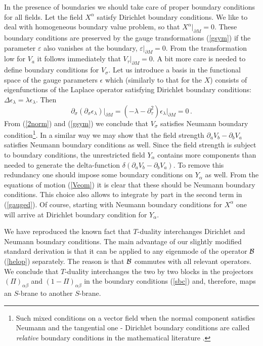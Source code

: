 \documentclass[a4paper,12pt,twoside]{article}
\begin{document}
In the presence of boundaries we should take care of proper
boundary conditions for all fields. Let the field $X^\alpha$
satisfy Dirichlet boundary conditions. We like to deal with
homogeneous boundary value problem, so that $X^\alpha|_{\partial M}=0$.
These boundary conditions are preserved by the gauge transformations
(\ref{gsym}) if the parameter $\varepsilon$ also vanishes at the
boundary, $\varepsilon|_{\partial M}=0$. From the transformation
low for $V_a$ it follows immediately that $V_\tau|_{\partial M}=0$.
A bit more care is needed to define boundary conditions for $V_\sigma$.
Let us introduce a basis in the functional space of the gauge
parameters $\epsilon$ which (similarly to that for the $X$) consists
of eigenfunctions of the Laplace operator satisfying Dirichlet
boundary conditions: $\Delta \epsilon_\lambda =\lambda \epsilon_\lambda$.
Then
\begin{equation}
\partial_\sigma (\partial_\sigma \epsilon_\lambda )\vert_{\partial M}=
(-\lambda -\partial_\tau^2 ) \epsilon_\lambda \vert_{\partial M}=0\,.
\label{2norm}
\end{equation} 
{}From (\ref{2norm}) and (\ref{gsym}) we conclude that $V_\sigma$
satisfies Neumann boundary condition\footnote{Such mixed 
conditions on a vector field when the normal component
satisfies Neumann and the tangential one - Dirichlet boundary
conditions are called {\it relative} boundary conditions in the mathematical
literature \cite{Gilkey}.}. In a similar way we may show that
the field strength $\partial_aV_b-\partial_bV_a$ satisfies 
Neumann boundary conditions as well. Since the field strength
is subject to boundary conditions, the unrestricted field $Y_\alpha$
contains more components than needed
 to generate the 
delta-function $\delta (\partial_aV_b-\partial_bV_a)$. 
To remove this redundancy one should impose some boundary conditions
on $Y_\alpha$ as well. From the equations of motion (\ref{Veom})
it is clear that these should be Neumann boundary conditions.
This choice also
allows to integrate by part in the second term in (\ref{gauged}).
Of course, starting with Neumann boundary conditions for
$X^\alpha$ one will arrive at Dirichlet boundary condition
for $Y_\alpha$. 

We have reproduced the known fact that $T$-duality interchanges
Dirichlet and Neumann boundary conditions. The main advantage
of our slightly modified standard derivation is that it can be
applied to any eigenmode of the operator ${\cal B}$ (\ref{helop})
separately. The reason is that ${\cal B}$ commutes with all relevant
operators. We conclude that $T$-duality interchanges the two by two
blocks in the projectors
$(\Pi )_{\alpha\beta}$ and $(1-\Pi )_{\alpha\beta}$
in the boundary conditions (\ref{sbc}) and, therefore, maps
an $S$-brane to another $S$-brane. 
\end{document}
